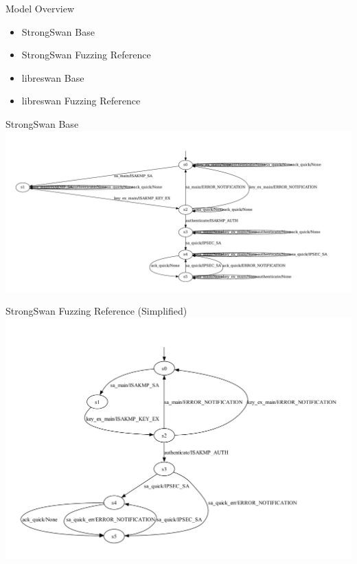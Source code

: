 \documentclass[aspectratio=169, xcolor=table]{beamer}
\begin{document}
\begin{frame}{Model Overview}
	\vspace{-1.5em}
	\begin{itemize}
		\item StrongSwan Base
		\item StrongSwan Fuzzing Reference
		\pause
		\item libreswan Base
		\item libreswan Fuzzing Reference
	\end{itemize}
\end{frame}

\begin{frame}{StrongSwan Base}
	\vspace{-4em}
	\centering
	\includegraphics[height=0.9\textheight, trim={8em 0 0 0}]{models/Reference.pdf}
\end{frame}

\begin{frame}{StrongSwan Fuzzing Reference (Simplified)}
	\vspace{-4em}
	\centering
	\includegraphics[height=1.0\textheight, trim={8em 0 0 0}]{models/strongSwanErrKV.pdf}
\end{frame}
\end{document}
